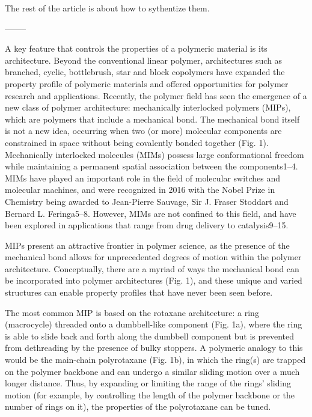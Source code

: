 \documentclass[../../main-notes.tex]{subfiles}
\begin{document}
The rest of the article is about how to sythentize them.

--------

\citep{hartMaterialPropertiesApplications2021}

A key feature that controls the properties of a polymeric material is its architecture. 
Beyond the conventional linear polymer, architectures such as branched, cyclic, bottlebrush, star and block copolymers have expanded the property profile of polymeric materials and offered opportunities for polymer research and applications. 
Recently, the polymer field has seen the emergence of a new class of polymer architecture: mechanically interlocked polymers (MIPs), which are polymers that  include a mechanical bond.
The mechanical bond itself is not a new idea, occurring when two (or more) molecular components are constrained in space without being covalently bonded together (Fig. 1). 
Mechanically interlocked molecules (MIMs) possess large conformational freedom while maintaining a permanent spatial association between the components1–4. 
MIMs have played an important role in the field of molecular switches and molecular machines, and were recognized in 2016 with the Nobel Prize in Chemistry being awarded to Jean-Pierre Sauvage, Sir J. Fraser Stoddart and Bernard L. Feringa5–8. 
However, MIMs are not confined to this field, and have been explored in applications that range from drug delivery to catalysis9–15.

MIPs present an attractive frontier in polymer science, as the presence of the mechanical bond allows for unprecedented degrees of motion within the polymer architecture. 
Conceptually, there are a myriad of ways the mechanical bond can be incorporated into polymer architectures (Fig. 1), and these unique and varied structures can enable property profiles that have never been seen before.


The most common MIP is based on the rotaxane architecture: a ring (macrocycle) threaded onto a dumbbell-like component (Fig. 1a), where the ring is able to slide back and forth along the dumbbell component but is prevented from dethreading by the presence of bulky stoppers. 
A polymeric analogy to this would be the main-chain polyrotaxane (Fig. 1b), in which the ring(s) are trapped on the polymer backbone and can undergo a similar sliding motion over a much longer distance. 
Thus, by expanding or limiting the range of the rings’ sliding motion (for example, by controlling the length of the polymer backbone or the number of rings on it), the properties of the polyrotaxane can be tuned. 
\end{document}

